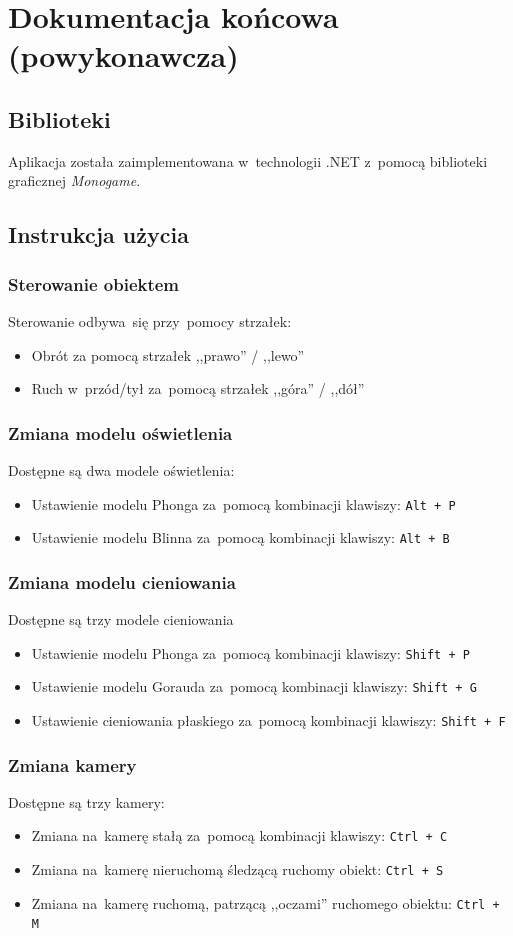 \documentclass[11pt, a4paper, oneside]{scrartcl}
\begin{document}
\section{Dokumentacja końcowa (powykonawcza)}
\subsection{Biblioteki}
Aplikacja została zaimplementowana w~technologii .NET z~pomocą biblioteki graficznej \textit{Monogame}.
\subsection{Instrukcja użycia}
\subsubsection{Sterowanie obiektem}
Sterowanie odbywa~się przy~pomocy strzałek: 
\begin{itemize}
	\item Obrót za pomocą strzałek ,,prawo'' / ,,lewo''
	\item Ruch w~przód/tył za~pomocą strzałek ,,góra'' / ,,dół''
\end{itemize}
\subsubsection{Zmiana modelu oświetlenia}
Dostępne są dwa modele oświetlenia:
\begin{itemize}
	\item Ustawienie modelu Phonga za~pomocą kombinacji klawiszy: \texttt{Alt + P}
	\item Ustawienie modelu Blinna za~pomocą kombinacji klawiszy: \texttt{Alt + B}
\end{itemize}
\subsubsection{Zmiana modelu cieniowania}
Dostępne są trzy modele cieniowania
\begin{itemize}
	\item Ustawienie modelu Phonga za~pomocą kombinacji klawiszy: \texttt{Shift + P}
	\item Ustawienie modelu Gorauda za~pomocą kombinacji klawiszy: \texttt{Shift + G}
	\item Ustawienie cieniowania płaskiego za~pomocą kombinacji klawiszy: \texttt{Shift + F}
\end{itemize}
\subsubsection{Zmiana kamery}
Dostępne są trzy kamery:
\begin{itemize}
	\item Zmiana na~kamerę stałą za~pomocą kombinacji klawiszy: \texttt{Ctrl + C}
	\item Zmiana na~kamerę nieruchomą śledzącą ruchomy obiekt: \texttt{Ctrl + S}
	\item Zmiana na~kamerę ruchomą, patrzącą ,,oczami'' ruchomego obiektu: \texttt{Ctrl + M}
\end{itemize}
\end{document}
